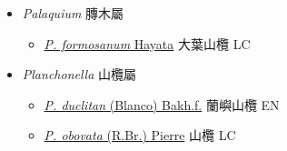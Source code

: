 
  \begin{itemize}
 \item[] \textit{Palaquium} 膞木屬
                    
  \begin{itemize}
        \item[] \href{http://www.theplantlist.org/tpl1.1/search?q=Palaquium+formosanum}{\textit{P. formosanum} Hayata}   大葉山欖 LC
  \end{itemize}
 \item[] \textit{Planchonella} 山欖屬
                    
  \begin{itemize}
        \item[] \href{http://www.theplantlist.org/tpl1.1/search?q=Planchonella+duclitan}{\textit{P. duclitan} (Blanco) Bakh.f.}   蘭嶼山欖 EN
        \item[] \href{http://www.theplantlist.org/tpl1.1/search?q=Planchonella+obovata}{\textit{P. obovata} (R.Br.) Pierre}   山欖 LC
  \end{itemize}
  \end{itemize}
